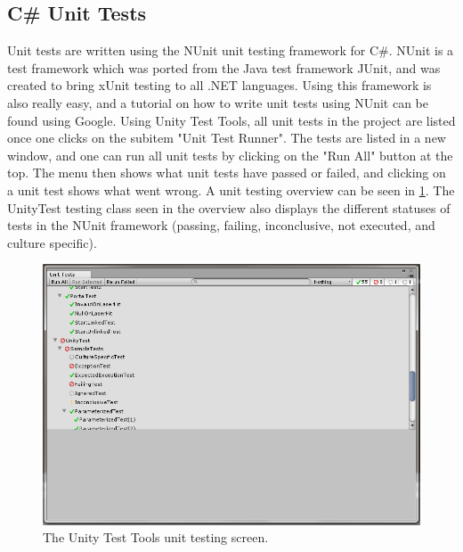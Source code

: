         \subsection{C\# Unit Tests} \label{ssec:csharpunittests)}
            Unit tests are written using the NUnit unit testing framework for 
            C\#. NUnit is a test framework which was ported from the Java test 
            framework JUnit, and was created to bring xUnit testing to all .NET 
            languages. Using this framework is also really easy, and a tutorial 
            on how to write unit tests using NUnit can be found using Google. 
            Using Unity Test Tools, all unit tests in the project are listed 
            once one clicks on the subitem "Unit Test Runner". The tests are 
            listed in a new window, and one can run all unit tests by clicking 
            on the "Run All" button at the top. The menu then shows what unit 
            tests have passed or failed, and clicking on a unit test shows what 
            went wrong. A unit testing overview can be seen in \ref{fig:unitytesttools}.
            The UnityTest testing class seen in the overview also displays
            the different statuses of tests in the NUnit framework (passing,
            failing, inconclusive, not executed, and culture specific).
            
            \begin{figure}[!ht]
                \centering
                \includegraphics[width=\textwidth]{UnityTestTools}
                \caption{The Unity Test Tools unit testing screen.}
                \label{fig:unitytesttools}
            \end{figure}
            
